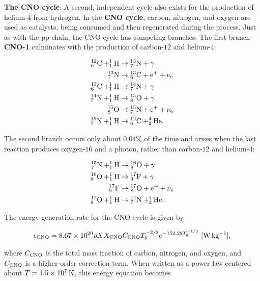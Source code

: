 \documentclass[a4paper,10pt]{article}
\begin{document}
{\noindent}\textbf{The CNO cycle}: A second, independent cycle also exists for the production of helium-$4$ from hydrogen. In the \textbf{CNO cycle}, carbon, nitrogen, and oxygen are used as catalysts, being consumed and then regenerated during the process. Just as with the pp chain, the CNO cycle has competing branches. The first branch \textbf{CNO-1} culminates with the production of carbon-$12$ and helium-$4$:

\begin{align*}
    {\rm ^{12}_6C + ^1_1H} &\rightarrow {\rm ^{13}_7N + \gamma} \\
    {\rm ^{13}_7N} &\rightarrow {\rm ^{13}_6C + e^+ + \nu_e} \\
    {\rm ^{13}_6C + ^1_1H} &\rightarrow {\rm ^{14}_7N + \gamma} \\
    {\rm ^{14}_7N + ^1_1H} &\rightarrow {\rm ^{15}_8O + \gamma} \\
    {\rm ^{15}_8O} &\rightarrow {\rm ^{15}_7N + e^+ + \nu_e} \\
    {\rm ^{15}_7N + ^1_1H} &\rightarrow {\rm ^{12}_6C + ^4_2He}.
\end{align*}

{\noindent}The second branch occurs only about $0.04\%$ of the time and arises when the last reaction produces oxygen-$16$ and a photon, rather than carbon-$12$ and helium-$4$:

\begin{align*}
    {\rm ^{15}_7N + ^1_1H} &\rightarrow {\rm ^{16}_8O + \gamma} \\
    {\rm ^{16}_8O + ^1_1H} &\rightarrow {\rm ^{17}_9F +\gamma} \\
    {\rm ^{17}_9F} &\rightarrow {\rm ^{17}_8O + e^+ + \nu_e} \\
    {\rm ^{17}_8O + ^1_1H} &\rightarrow {\rm ^{14}_7N + ^4_2He}.
\end{align*}

{\noindent}The energy generation rate for the CNO cycle is given by

\begin{align*}
    \epsilon_{\rm CNO} = 8.67\times10^{20}\rho XX_{\rm CNO} C_{\rm CNO}T_6^{-2/3}e^{-152.28T_6^{-1/3}} ~ [{\rm W\,kg^{-1}}],
\end{align*}

{\noindent}where $C_{\rm CNO}$ is the total mass fraction of carbon, nitrogen, and oxygen, and $C_{\rm CNO}$ is a higher-order correction term. When written as a power law centered about $T=1.5\times10^7\,{\rm K}$, this energy equation becomes
\end{document}
